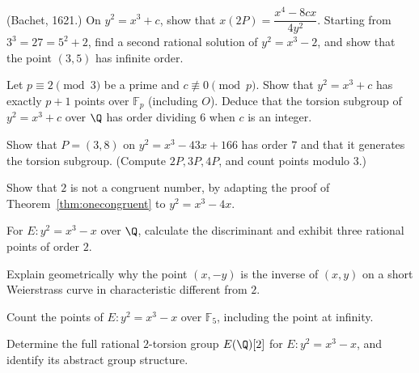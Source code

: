 \begin{exercise}[$\star\star$]\label{ex:bachet}
(Bachet, 1621.) On $y^2=x^3+c$, show that $x(2P)=\dfrac{x^4-8cx}{4y^2}$. Starting from $3^3=27=5^2+2$, find a second rational solution of $y^2=x^3-2$, and
show that the point $(3,5)$ has infinite order.
\end{exercise}

\begin{exercise}[$\star\star$]\label{ex:supersing}
Let $p\equiv2\pmod3$ be a prime and $c\not\equiv0\pmod p$. Show that $y^2=x^3+c$ has exactly $p+1$ points over $\mathbb F_p$ (including $O$). Deduce that the torsion
subgroup of $y^2=x^3+c$ over $\Q$ has order dividing $6$ when $c$ is an integer.
\end{exercise}

\begin{exercise}[$\star\star$]\label{ex:torsion7}
Show that $P=(3,8)$ on $y^2=x^3-43x+166$ has order $7$ and that it generates the torsion subgroup. (Compute $2P,3P,4P$, and count points modulo $3$.)
\end{exercise}

\begin{exercise}[$\star\star\star$]\label{ex:twonotcong}
Show that $2$ is not a congruent number, by adapting the proof of Theorem~\ref{thm:onecongruent} to $y^2=x^3-4x$.
\end{exercise}

\begin{exercise}[$\star$]\label{ex:v13-extra-15-1}
For $E:y^2=x^3-x$ over $\Q$, calculate the discriminant and exhibit three rational points of order $2$.
\end{exercise}

\begin{exercise}[$\star$]\label{ex:v13-extra-15-2}
Explain geometrically why the point $(x,-y)$ is the inverse of $(x,y)$ on a short Weierstrass curve in characteristic different from $2$.
\end{exercise}

\begin{exercise}[$\star\star$]\label{ex:v13-extra-15-3}
Count the points of $E:y^2=x^3-x$ over $\mathbb F_5$, including the point at infinity.
\end{exercise}

\begin{exercise}[$\star\star$]\label{ex:v13-extra-15-4}
Determine the full rational $2$-torsion group $E(\Q)[2]$ for $E:y^2=x^3-x$, and identify its abstract group structure.
\end{exercise}

